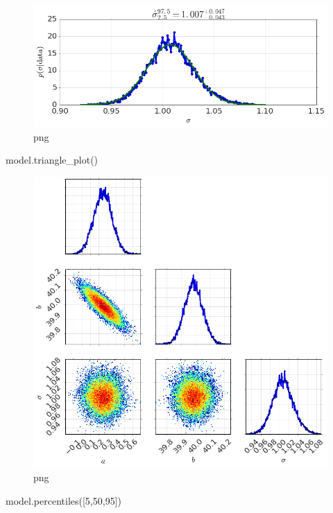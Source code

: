 \documentclass[]{article}
\newenvironment{Shaded}{}{}
\newcommand{\DecValTok}[1]{\textcolor[rgb]{0.25,0.63,0.44}{{#1}}}
\newcommand{\NormalTok}[1]{{#1}}
\begin{document}
\begin{figure}[htbp]
\centering
\includegraphics{output_23_2.png}
\caption{png}
\end{figure}

\begin{Shaded}
\begin{Highlighting}[]
\NormalTok{model.triangle_plot()}
\end{Highlighting}
\end{Shaded}

\begin{figure}[htbp]
\centering
\includegraphics{output_24_0.png}
\caption{png}
\end{figure}

\begin{Shaded}
\begin{Highlighting}[]
\NormalTok{model.percentiles([}\DecValTok{5}\NormalTok{,}\DecValTok{50}\NormalTok{,}\DecValTok{95}\NormalTok{])}
\end{Highlighting}
\end{Shaded}
\end{document}
